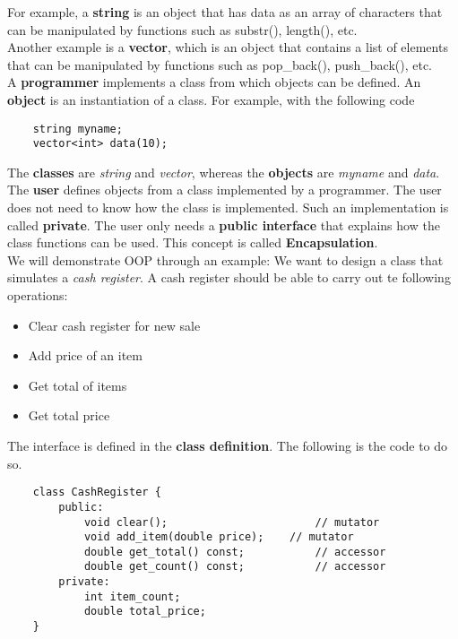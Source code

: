 \documentclass[]{article}
\begin{document}
For example, a \textbf{string} is an object that has data as an array of characters that can be manipulated by functions such as substr(), length(), etc.\\

Another example is a \textbf{vector}, which is an object that contains a list of elements that can be manipulated by functions such as pop\_back(), push\_back(), etc. \\

A \textbf{programmer} implements a class from which objects can be defined. An \textbf{object} is an instantiation of a class. For example, with the following code

\begin{lstlisting}
	string myname;
	vector<int> data(10);
\end{lstlisting}\bigbreak

The \textbf{classes} are \textit{string} and \textit{vector}, whereas the \textbf{objects} are \textit{myname} and \textit{data}.\\

The \textbf{user} defines objects from a class implemented by a programmer. The user does not need to know how the class is implemented. Such an implementation is called \textbf{private}. The user only needs a \textbf{public interface} that explains how the class functions can be used. This concept is called \textbf{Encapsulation}.\\

We will demonstrate OOP through an example: We want to design a class that simulates a \textit{cash register}. A cash register should be able to carry out te following operations:

\begin{itemize}
	\item Clear cash register for new sale
	\item Add price of an item
	\item Get total of items
	\item Get total price
\end{itemize}\bigbreak

The interface is defined in the \textbf{class definition}. The following is the code to do so.\\

\begin{lstlisting}
	class CashRegister {
		public:
			void clear();  						// mutator
			void add_item(double price);  	// mutator
			double get_total() const; 			// accessor
			double get_count() const; 			// accessor
		private:
			int item_count;
			double total_price;
	}
\end{lstlisting}\bigbreak
\end{document}
